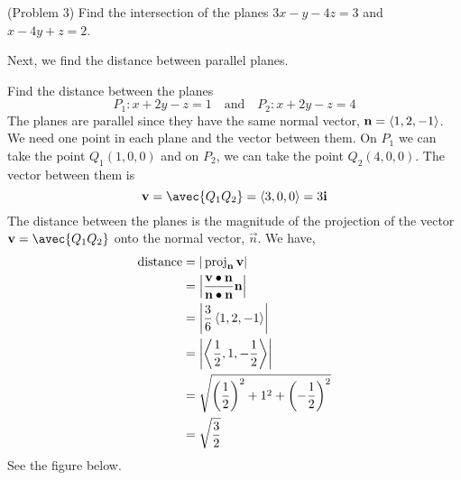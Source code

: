 \documentclass[handout]{ximera}
\begin{document}
\begin{problem}(Problem 3)
Find the intersection of the planes $3x - y -4z = 3$ and $x - 4y + z = 2$.\\
\end{problem}


Next, we find the distance between parallel planes.

\begin{example}[Example 4]
Find the distance between the planes 
\[
P_1: x +2y - z = 1 \quad \text{and} \quad P_2: x+2y-z = 4
\]
The planes are parallel since they have the same normal vector, $\mathbf{n} = \left\langle 1, 2, -1\right\rangle$. 
We need one point in each plane and the vector between them.
On $P_1$ we can take the point $Q_1(1, 0, 0)$ and on $P_2$, we can take the point $Q_2(4, 0, 0)$. 
The vector between them is 
\[
\vec{v} = \avec{Q_1Q_2} = \vector{3,0,0} = 3\vec{i}
\]
The distance between the planes is the magnitude of the projection of the vector $\vec{v} = \avec{Q_1Q_2}$ onto the 
normal vector, $\vec{n}$. We have,
\begin{align*}
\text{distance} &= | \operatorname{proj}_{\mathbf{n}}\mathbf{v}| \\
               &= \left| \frac{\mathbf{v}\bullet \mathbf{n}}{\mathbf{n}\bullet \mathbf{n}} \mathbf{n}\right|\\
               &= \left|\frac{3}{6} \left\langle 1, 2, -1\right\rangle\right|\\
               &= \left| \left\langle \frac12, 1, -\frac12\right\rangle\right|\\
               &= \sqrt{\left( \frac12\right)^2 + 1^2 + \left( -\frac12\right)^2}\\
               & = \sqrt{\frac32}
\end{align*}
See the figure below.

\begin{image}
\end{image}

\end{example}
\end{document}
